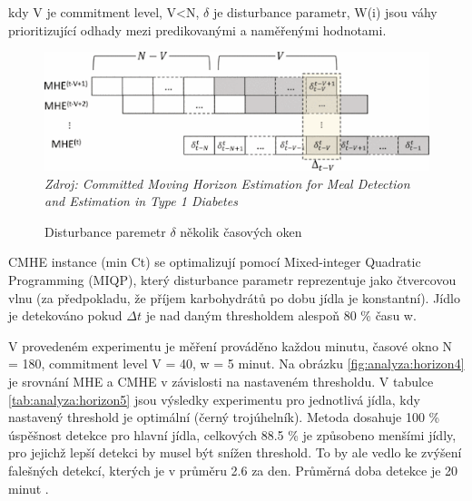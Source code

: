 
kdy V je commitment level, V<N, $\delta$ je disturbance parametr, W(i) jsou váhy prioritizující odhady mezi predikovanými a naměřenými hodnotami.

\begin{figure}[H]
\caption{Disturbance paremetr $\delta$ několik časových oken}
\label{fig:analyza:horizon1}
\centering
\includegraphics[width=1\textwidth]{img/analyzaCHO/horizon1.png}\\
\textit{Zdroj: Committed Moving Horizon Estimation for Meal Detection and Estimation in Type 1 Diabetes \citep{analyzaCHO.MovingHorizon}}
\end{figure}

CMHE instance (min Ct) se optimalizují pomocí Mixed-integer Quadratic Programming (MIQP), který disturbance parametr reprezentuje jako čtvercovou vlnu (za předpokladu, že příjem karbohydrátů po dobu jídla je konstantní). Jídlo je detekováno pokud $\Delta t$ je nad daným thresholdem alespoň 80 \% času w.

V provedeném experimentu je měření prováděno každou minutu, časové okno N = 180, commitment level V = 40, w = 5 minut. Na obrázku \ref{fig:analyza:horizon4} je srovnání MHE a CMHE v závislosti na nastaveném thresholdu.  V tabulce \ref{tab:analyza:horizon5} jsou výsledky experimentu pro jednotlivá jídla, kdy nastavený threshold je optimální (černý trojúhelník). Metoda dosahuje 100 \% úspěšnost detekce pro hlavní jídla, celkových 88.5 \% je způsobeno menšími jídly, pro jejichž lepší detekci by musel být snížen threshold. To by ale vedlo ke zvýšení falešných detekcí, kterých je v průměru 2.6 za den. Průměrná doba detekce je 20 minut \citep{analyzaCHO.MovingHorizon}.

